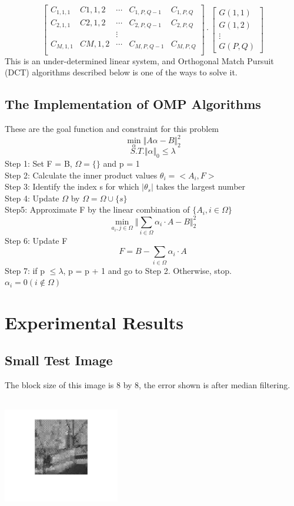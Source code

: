 \documentclass{article}
\begin{document}
$$
\begin{bmatrix}
C_{1,1,1} & C{1,1,2} & \cdots & C_{1,P,Q-1} & C_{1,P,Q}\\
C_{2,1,1} & C{2,1,2} & \cdots & C_{2,P,Q-1} & C_{2,P,Q}\\
&&\vdots\\
C_{M,1,1} & C{M,1,2} & \cdots & C_{M,P,Q-1} & C_{M,P,Q}\\
\end{bmatrix}
\cdot
\begin{bmatrix}
G(1,1)\\
G(1,2)\\
\vdots\\
G(P,Q)
\end{bmatrix}
$$
This is an under-determined linear system, and  Orthogonal Match Pursuit (DCT) algorithms described below is one of the ways to solve it.
\subsection{The Implementation of OMP Algorithms}
These are the goal function and constraint for this problem
$$
\min_\alpha \Vert A \alpha - B\Vert^2_2
$$
$$
S.T. \Vert \alpha \Vert_0 \leq \lambda
$$
Step 1: Set F = B, $ \Omega = \{\} $ and p = 1
$$
$$
Step 2: Calculate the inner product values $ \theta_i = <A_i, F> $
$$
$$
Step 3: Identify the index s for which $ \vert \theta_s\vert $ takes the largest number
$$
$$
Step 4: Update $\Omega $ by $\Omega = \Omega \cup \{s\}$
$$
$$
Step5: Approximate F by the linear combination of $ \{ A_i, i \in \Omega \} $
$$
$$
$$\min_{a_i,j \in \Omega} \Vert \sum_{i\in\Omega }\alpha_i \cdot A - B \Vert_2^2$$
$$
$$
Step 6: Update F
$$
$$
$$F = B - \sum_{i \in \Omega}\alpha_i \cdot A$$
$$
$$
Step 7: if p $\le \lambda$, p = p + 1 and go to Step 2. Otherwise, stop.
$$
$$
$\alpha_i = 0 (i \notin \Omega)$
$$
$$
\section{Experimental Results}

\subsection{Small Test Image}

The block size of this image is 8 by 8, the error shown is after median filtering.


\includegraphics[width=2in,height=2in]{1-10.png}
\vspace{-0.5in}
\end{document}
